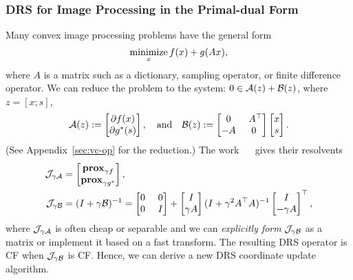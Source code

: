 \subsubsection{DRS for Image Processing in the Primal-dual Form \cite{o2014primal}}
Many convex image processing problems have the general form
$$\operatorname*{minimize}_{x} f(x) + g(Ax),$$
where $A$ is a matrix such as a dictionary, sampling operator, or finite difference operator. We can reduce the problem to the system: $0\in{\mathcal{A}}(z) + {\mathcal{B}}(z)$, where $z=[x;s]$,
$$\cA(z):=\begin{bmatrix}\partial f(x)\\\partial g^*(s)\end{bmatrix},\quad\mbox{and}\quad \cB(z):=\begin{bmatrix}0 & ~A^\top  \\ -A & 0\end{bmatrix}\begin{bmatrix}x\\s\end{bmatrix}.$$
(See Appendix~\ref{sec:vc-op} for the reduction.) The work \mbox{%
\cite{o2014primal} }%
gives their resolvents    
\begin{align*}\cJ_{\gamma \cA} &= \begin{bmatrix}\prox_{\gamma f}\\\prox_{\gamma g^*}\end{bmatrix},\\ 
\cJ_{\gamma \cB} &= (I+\gamma \cB)^{-1}= \begin{bmatrix} 0 &~ 0 \\ 0 &~ I\end{bmatrix}+\begin{bmatrix}I\\ \gamma A\end{bmatrix}(I+\gamma^2 A^\top A)^{-1}\begin{bmatrix}I\\ -\gamma A\end{bmatrix}^\top ,
\end{align*}
where ${\mathcal{J}}_{\gamma {\mathcal{A}}}$ is often cheap or separable and we can \emph{explicitly form}  ${\mathcal{J}}_{\gamma {\mathcal{B}}}$  as a matrix or implement it based on a fast transform. The resulting DRS operator is CF when ${\mathcal{J}}_{\gamma {\mathcal{B}}}$ is CF. Hence, we can derive a new DRS coordinate update algorithm. 

